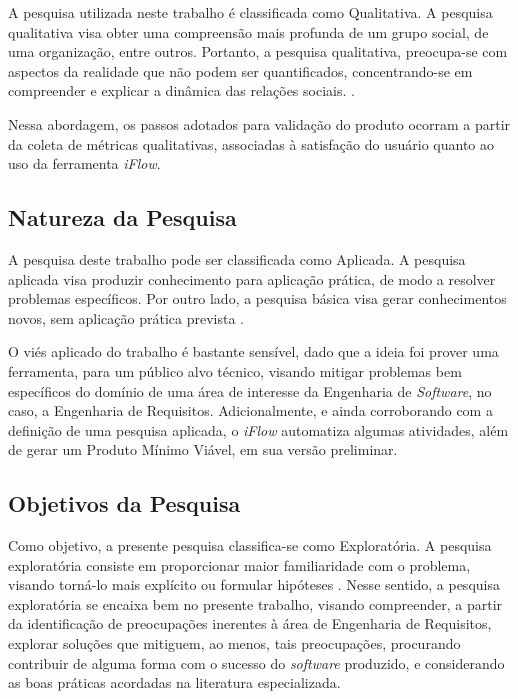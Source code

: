 A pesquisa utilizada neste trabalho é classificada como Qualitativa. A pesquisa qualitativa visa obter uma compreensão mais profunda de um grupo social, de uma organização, entre outros. Portanto, a pesquisa qualitativa, preocupa-se com aspectos da realidade que não podem ser quantificados, concentrando-se em compreender e explicar a dinâmica das relações sociais. \cite{gerhardt2009metodos}.

Nessa abordagem, os passos adotados para validação do produto ocorram a partir da coleta de métricas qualitativas, associadas à satisfação do usuário quanto ao uso da ferramenta \textit{iFlow}.

\subsection{Natureza da Pesquisa}

A pesquisa deste trabalho pode ser classificada como Aplicada. A pesquisa aplicada visa produzir conhecimento para aplicação prática, de modo a resolver problemas específicos. Por outro lado, a pesquisa básica visa gerar conhecimentos novos, sem aplicação prática prevista \cite{gerhardt2009metodos}.

O viés aplicado do trabalho é bastante sensível, dado que a ideia foi prover uma ferramenta, para um público alvo técnico, visando mitigar problemas bem específicos do domínio de uma área de interesse da Engenharia de \textit{Software}, no caso, a Engenharia de Requisitos. Adicionalmente, e ainda corroborando com a definição de uma pesquisa aplicada, o \textit{iFlow} automatiza algumas atividades, além de gerar um Produto Mínimo Viável, em sua versão preliminar.

\subsection{Objetivos da Pesquisa}
Como objetivo, a presente pesquisa classifica-se como Exploratória. A pesquisa exploratória consiste em proporcionar maior familiaridade com o problema, visando torná-lo mais explícito ou formular hipóteses \cite{gil2002elaborar}. Nesse sentido, a pesquisa exploratória se encaixa bem no presente trabalho, visando compreender, a partir da identificação de preocupações inerentes à área de Engenharia de Requisitos, explorar soluções que mitiguem, ao menos, tais preocupações, procurando contribuir de alguma forma com o sucesso do \textit{software} produzido, e considerando as boas práticas acordadas na literatura especializada.

